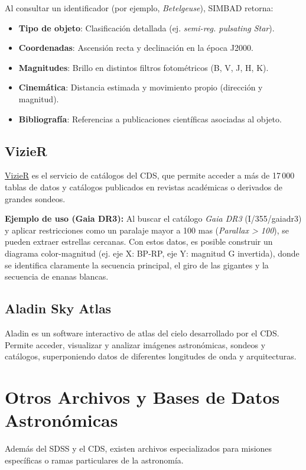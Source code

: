Al consultar un identificador (por ejemplo, \textit{Betelgeuse}), SIMBAD retorna:
\begin{itemize}
    \item \textbf{Tipo de objeto}: Clasificación detallada (ej. \textit{semi-reg. pulsating Star}).
    \item \textbf{Coordenadas}: Ascensión recta y declinación en la época J2000.
    \item \textbf{Magnitudes}: Brillo en distintos filtros fotométricos (B, V, J, H, K).
    \item \textbf{Cinemática}: Distancia estimada y movimiento propio (dirección y magnitud).
    \item \textbf{Bibliografía}: Referencias a publicaciones científicas asociadas al objeto.
\end{itemize}

\subsection{VizieR}
\href{https://vizier.u-strasbg.fr/viz-bin/VizieR}{VizieR} es el servicio de catálogos del CDS, que permite acceder a más de 17\,000 tablas de datos y catálogos publicados en revistas académicas o derivados de grandes sondeos.

\textbf{Ejemplo de uso (Gaia DR3):}
Al buscar el catálogo \textit{Gaia DR3} (I/355/gaiadr3) y aplicar restricciones como un paralaje mayor a 100 mas (\textit{Parallax > 100}), se pueden extraer estrellas cercanas. Con estos datos, es posible construir un diagrama color-magnitud (ej. eje X: BP-RP, eje Y: magnitud G invertida), donde se identifica claramente la secuencia principal, el giro de las gigantes y la secuencia de enanas blancas.

\subsection{Aladin Sky Atlas}
Aladin es un software interactivo de atlas del cielo desarrollado por el CDS. Permite acceder, visualizar y analizar imágenes astronómicas, sondeos y catálogos, superponiendo datos de diferentes longitudes de onda y arquitecturas.

\section{Otros Archivos y Bases de Datos Astronómicas}

Además del SDSS y el CDS, existen archivos especializados para misiones específicas o ramas particulares de la astronomía.

